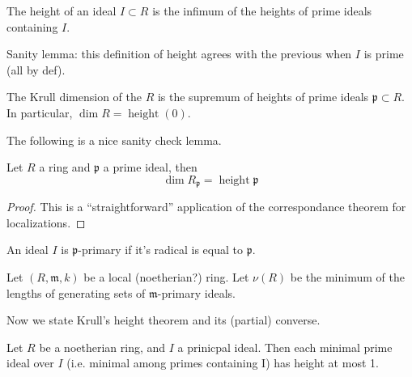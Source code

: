 \newcommand{\height}{\operatorname{height}}


\begin{definition}
    \label{def:height_arbitrary_ideal}
    The height of an ideal \(I \subset R\)
    is the infimum of the heights of
    prime ideals containing \(I\).
\end{definition}
    
Sanity lemma: this definition of height agrees
with the previous when \(I\) is prime (all by def).

\begin{definition}
    \label{def:krull_dim_ring}
    The Krull dimension of the \(R\)
    is the supremum of heights of prime
    ideals \(\mathfrak{p} \subset R\).
    In particular, \(\dim R = \height (0)\).
\end{definition}
    
The following is a nice sanity check lemma.
    
\begin{lemma}
    \label{lem:dim_local_eq_height_prime}
    Let \(R\) a ring and \(\mathfrak{p}\) a
    prime ideal, then
    \[
    \dim R_{\mathfrak{p}} = \height \mathfrak{p}
    \]
\end{lemma}
    
\begin{proof}
    This is a ``straightforward'' application of the
    correspondance theorem for localizations.
\end{proof}
    
\begin{definition}
    \label{def:primary_ideal}
    An ideal \(I\) is \(\mathfrak{p}\)-primary if it's
    radical is equal to \(\mathfrak{p}\).
\end{definition}

\begin{definition}
    \label{def:min_len_gen_set_maximal}
    Let \((R,\mathfrak{m},k)\) be a local (noetherian?) ring.
    Let \(\nu(R)\)
    be the minimum of the lengths of generating sets of  
    \(\mathfrak{m}\)-primary ideals.
\end{definition}

Now we state Krull's height theorem and its (partial) converse.



\begin{theorem}
    \label{thm:krull_principal_ideal}
    Let \(R\) be a noetherian ring, 
    and \(I\) a prinicpal ideal.
    Then each minimal prime ideal over \(I\) 
    (i.e. minimal among primes containing I)
    has height at most 1.
\end{theorem}

